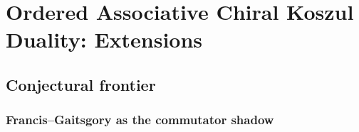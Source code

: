 
\providecommand{\Assch}{\mathrm{Ass}^{\mathrm{ch}}}
\providecommand{\Barch}{\overline{B}^{\mathrm{ch}}}
\providecommand{\Cobar}{\Omega^{\mathrm{ch}}}
\providecommand{\coHoch}{\operatorname{coHH}}
\providecommand{\Cotor}{\operatorname{Cotor}}
\providecommand{\Coext}{\operatorname{Coext}}
\providecommand{\RHom}{R\!\operatorname{Hom}}
\providecommand{\Tot}{\operatorname{Tot}}
\providecommand{\KK}{\mathbb{K}}
\providecommand{\Dpbw}{D^{\mathrm{pbw}}}
\providecommand{\Dco}{D^{\mathrm{co}}}
\providecommand{\chotimes}{\mathbin{\otimes^{\mathrm{ch}}}}
\providecommand{\wt}{\widetilde}
\providecommand{\eps}{\varepsilon}
\providecommand{\susp}{s}
\providecommand{\coeq}{\operatorname{coeq}}
\providecommand{\id}{\mathrm{id}}
\providecommand{\op}{\mathrm{op}}
\providecommand{\cop}{\mathrm{cop}}
\providecommand{\HH}{\operatorname{HH}}
\providecommand{\Tor}{\operatorname{Tor}}
\providecommand{\Ext}{\operatorname{Ext}}
\providecommand{\gr}{\operatorname{gr}}
\providecommand{\MC}{\operatorname{MC}}
\providecommand{\Ob}{\operatorname{Ob}}
\providecommand{\eq}{\operatorname{eq}}
\providecommand{\cF}{\mathcal{F}}
\providecommand{\cL}{\mathcal{L}}
\providecommand{\cA}{\mathcal{A}}
\providecommand{\PhiFA}{\Phi^{\mathrm{FA}}}
\providecommand{\ChirHoch}{\mathrm{ChirHoch}}


\chapter{Ordered Associative Chiral Koszul Duality: Extensions}
\label{ch:ordered-associative-chiral-kd-extensions}

\section{Conjectural frontier}
\label{sec:conjectures}

\subsection{Francis--Gaitsgory as the commutator shadow}

